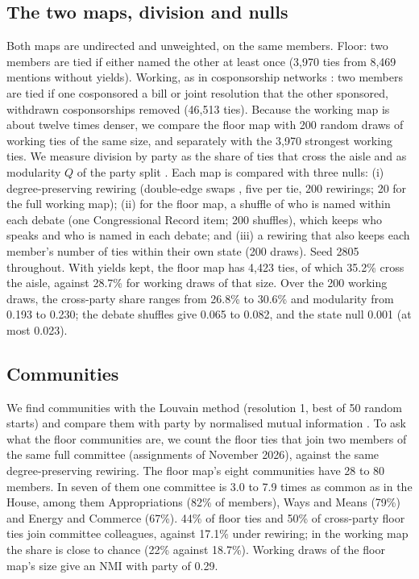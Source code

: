\documentclass[9pt,twocolumn,twoside]{pnas-new}
\begin{document}
{\subsection*{The two maps, division and nulls}
Both maps are undirected and unweighted, on the same members. Floor: two members are tied if either named the other
at least once (3,970 ties from 8,469 mentions without yields). Working, as in cosponsorship networks \cite{fowler2006}:
two members are tied if one cosponsored a bill or joint resolution that the other sponsored, withdrawn cosponsorships
removed (46,513 ties). Because the working map is about twelve times denser, we compare the floor map with 200 random
draws of working ties of the same size, and separately with the 3,970 strongest working ties. We measure division by
party as the share of ties that cross the aisle and as modularity $Q$ of the party split \cite{newman2006}. Each map
is compared with three nulls: (i) degree-preserving rewiring (double-edge swaps \cite{maslov2002}, five per tie, 200
rewirings; 20 for the full working map); (ii) for the floor map, a shuffle of who is named within each debate (one
Congressional Record item; 200 shuffles), which keeps who speaks and who is named in each debate; and (iii) a rewiring
that also keeps each member's number of ties within their own state (200 draws). Seed 2805 throughout. With yields kept, the floor map has 4,423 ties, of which 35.2\% cross the aisle, against 28.7\% for working draws of
that size. Over the 200 working draws, the cross-party share ranges from 26.8\% to 30.6\% and modularity from 0.193
to 0.230; the debate shuffles give 0.065 to 0.082, and the state null 0.001 (at most 0.023).

\subsection*{Communities}
We find communities with the Louvain method \cite{blondel2008} (resolution 1, best of 50 random starts) and compare
them with party by normalised mutual information \cite{danon2005}. To ask what the floor communities are, we count the
floor ties that join two members of the same full committee (assignments of November 2026), against the same
degree-preserving rewiring. The floor map's eight communities have 28 to 80 members. In seven of them one committee is 3.0 to 7.9 times as
common as in the House, among them Appropriations (82\% of members), Ways and Means (79\%) and Energy and Commerce
(67\%). 44\% of floor ties and 50\% of cross-party floor ties join committee colleagues, against 17.1\% under
rewiring; in the working map the share is close to chance (22\% against 18.7\%). Working draws of the floor map's
size give an NMI with party of 0.29.

}
\end{document}
